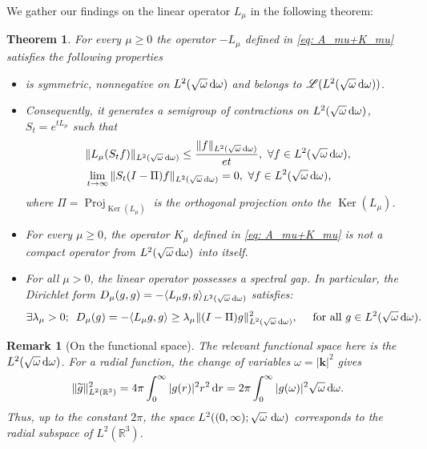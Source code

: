 \documentclass[reqno,11pt,letterpaper]{amsart}
\numberwithin{equation}{section}
\newcommand{\dd}{\, {\rm d}}
\newtheorem{theorem}{Theorem}
\newtheorem{remark}{Remark}
\begin{document}
We gather our findings on the linear operator $L_\mu$ in the following theorem:

\begin{theorem}
\label{MainTh2}
For every $\mu \ge 0$ the operator $-L_\mu $ defined in \eqref{eq: A_mu+K_mu} satisfies the following properties 
\begin{itemize}
    \item[(i)] is symmetric, nonnegative on $L^2(\sqrt \omega \dd\omega )$ and belongs to $\mathscr L(L^2(\sqrt \omega \dd\omega ))$.
    \item[(ii)] Consequently, it  generates a semigroup of contractions on $L^2(\sqrt \omega \dd\omega )$,  $S_t=e^{tL_\mu }$ such that
\begin{align*}
&\|L_\mu (S_tf)\|
 _{ L^2(\sqrt \omega \dd\omega ) }\le 
\frac{\|f\|
 _{ L^2(\sqrt \omega \dd\omega ) }}{e t},\,\,\forall f\in  L^2(\sqrt \omega \dd\omega ),\\
 &\lim_{t\to \infty}\|S_t(I-\Pi)f\|_{ L^2(\sqrt \omega \dd\omega ) }=0,\,\,\forall f\in  L^2(\sqrt \omega \dd\omega ),
  \end{align*}
  where $\Pi = \operatorname{Proj}_{\operatorname{Ker}(L_\mu)}$ is the orthogonal projection onto the $\operatorname{Ker}(L_\mu)$.
  \item[(iii)] For every $\mu \ge 0$, the operator $K_\mu $ defined in \eqref{eq: A_mu+K_mu} is not a compact operator from $L^2(\sqrt \omega \dd\omega )$ into itself. 
  \item[(iv)]\label{Theo:Theo2(iv)} For all $\mu >0$, the linear operator possesses a spectral gap. In particular, the Dirichlet form 
$D_\mu (g,g) = -\langle L_\mu  g, g\rangle_{ L^2(\sqrt \omega \dd \omega) }$  satisfies:
    $$ \exists \lambda_\mu >0;\,\,\, D_{\mu}(g) = - \langle L_\mu g,g \rangle \geq \lambda_\mu \| (I - \Pi)g\|_{L^2(\sqrt{\omega}\dd \omega)}^2, \quad \text{ for all } g \in L^2(\sqrt{\omega}\dd\omega). $$
\end{itemize}
\end{theorem}
\begin{remark}[On the functional space] \label{rem:on_functional_space}
    The relevant functional space here is the  $L^2(\sqrt{\omega}\dd\omega)$. 
For a radial function, the change of variables
$\omega=|\textbf{k}|^2$
gives
\begin{equation}
    \|\widetilde g\|_{L^2(\mathbb{R}^3)}^2
    =
    4\pi\int_0^\infty
    |g(r)|^2r^2 \dd r=
    2\pi\int_0^\infty
    |g(\omega)|^2\sqrt{\omega}\dd\omega.
\end{equation}
Thus, up to the constant $2\pi$,
the space $L^2((0,\infty);\sqrt{\omega}\,\dd\omega)
$
corresponds to the radial subspace of $L^2(\mathbb{R}^3)$. 
\end{remark}
\end{document}
